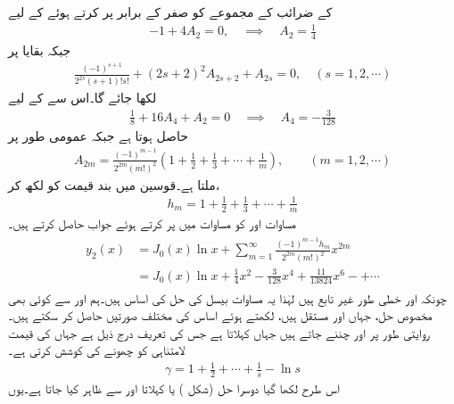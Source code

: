  کے ضرائب کے مجموعے کو صفر کے برابر پر کرتے ہوئے  کے لیے
\begin{align*}
-1+4A_2=0, \quad \implies \quad A_2=\frac{1}{4}
\end{align*}
جبکہ بقایا  پر
\begin{align*}
\frac{(-1)^{s+1}}{2^{2s}(s+1)!s!}+(2s+2)^2A_{2s+2}+A_{2s}=0,\quad (s=1,2,\cdots)
\end{align*}
لکھا جائے گا۔اس سے  کے لیے
\begin{align*}
\frac{1}{8}+16A_4+A_2=0\quad \implies \quad A_4=-\frac{3}{128}
\end{align*}
حاصل ہوتا ہے جبکہ عمومی طور پر
\begin{align}\label{مساوات_بیسل_دوہرا_صفر_ت}
A_{2m}=\frac{(-1)^{m-1}}{2^{2m}(m!)^2}\left(1+\frac{1}{2}+\frac{1}{3}+\cdots+\frac{1}{m}\right), \quad \quad (m=1,2,\cdots)
\end{align}
ملتا ہے۔قوسین میں بند قیمت کو  لکھ کر،
\begin{align}\label{مساوات_بیسل_دوہرا_صفر_ٹ}
h_m=1+\frac{1}{2}+\frac{1}{3}+\cdots+\frac{1}{m}
\end{align}
مساوات  اور  کو مساوات  میں پر کرتے ہوئے جواب حاصل کرتے ہیں۔
\begin{gather}
\begin{aligned}
y_2(x)&=J_0(x)\ln x+\sum_{m=1}^{\infty}\frac{(-1)^{m-1}h_m}{2^{2m}(m!)^2}x^{2m}\\
&=J_0(x)\ln x+\frac{1}{4}x^2-\frac{3}{128}x^4+\frac{11}{\num{13824}}x^6-+\cdots
\end{aligned}
\end{gather}
چونکہ  اور  خطی طور غیر تابع ہیں لہٰذا یہ مساوات بیسل  کی حل کی اساس ہیں۔ہم  اور  سے کوئی بھی مخصوص حل،  جہاں  اور  مستقل ہیں، لکھتے ہوئے اساس کی مختلف صورتیں حاصل کر سکتے ہیں۔روایتی طور پر  اور  چننے جاتے ہیں جہاں   کہلاتا ہے جس کی تعریف درج ذیل ہے جہاں  کی قیمت لامتناہی کو چھونے کی کوشش کرتی ہے۔
\begin{align}
\gamma=1+\frac{1}{2}+\cdots+\frac{1}{s}-\ln s
\end{align}
اس طرح لکھا گیا دوسرا حل  (شکل ) یا  کہلاتا اور  سے ظاہر کیا جاتا ہے۔یوں
